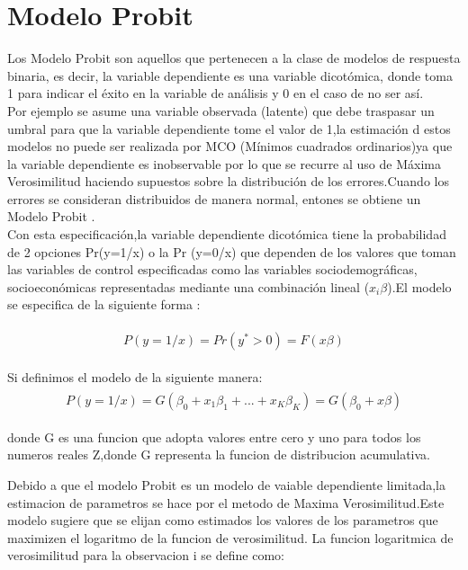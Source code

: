 \documentclass[11pt,fleqn]{book} %
\numberwithin{equation}{section} %
\numberwithin{figure}{section} %
\numberwithin{table}{section} %
\begin{document}
\section{Modelo Probit}

Los Modelo Probit son aquellos que pertenecen a la clase de modelos de respuesta binaria, es decir, la variable dependiente es una variable dicotómica, donde toma 1 para indicar el éxito en la variable de análisis y 0 en el caso de no ser así.
\\
Por ejemplo se asume una variable observada (latente) que debe traspasar un umbral para que la variable dependiente tome el valor de 1,la estimación d estos modelos no puede ser realizada por MCO (Mínimos cuadrados ordinarios)ya que la variable dependiente es inobservable por lo que se recurre al uso de Máxima Verosimilitud haciendo supuestos sobre la distribución de los errores.Cuando los errores se consideran distribuidos de manera normal, entones se obtiene un Modelo Probit .
\\
Con esta especificación,la variable dependiente dicotómica tiene la probabilidad de 2 opciones Pr(y=1/x) o la Pr (y=0/x) que dependen de los valores que toman las variables de control especificadas como las variables sociodemográficas, socioeconómicas representadas mediante una combinación lineal ($x_{i}\beta$).El modelo se especifica de la siguiente forma :

\begin{align} 
\begin{split}
P(y=1/x)= Pr(y^{*}>0)=F(x\beta)
\end{split}					
\end{align}


Si definimos el modelo de la siguiente manera:
\begin{align} 
\begin{split}
P(y=1/x)=G(\beta_{0}+x_{1}\beta_{1}+ ... + x_{K}\beta_{K})=G(\beta_{0}+x\beta)
\end{split}					
\end{align}
 

donde G es una funcion que adopta valores entre cero y uno para todos los numeros reales Z,donde G representa la funcion de distribucion acumulativa.

Debido a que el modelo Probit es un modelo de vaiable dependiente limitada,la estimacion de parametros se hace por el metodo de Maxima Verosimilitud.Este modelo sugiere que se elijan como estimados los valores de los parametros que maximizen el logaritmo de la funcion de verosimilitud.
La funcion logaritmica de verosimilitud para la observacion i se define como: 
\end{document}
